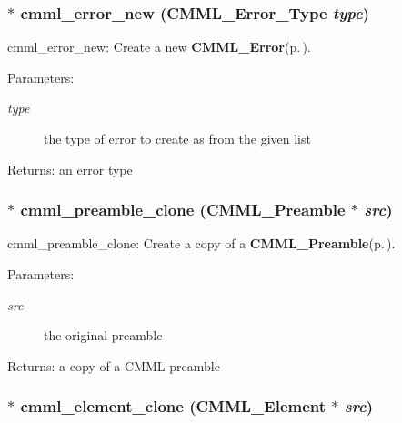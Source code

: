 \subsubsection{$\ast$ cmml\_\-error\_\-new ({\bf CMML\_\-Error\_\-Type} {\em type})}\label{cmml_8h_a61}


cmml\_\-error\_\-new: Create a new {\bf CMML\_\-Error}{\rm (p.\,\pageref{structCMML__Error})}.

\begin{Desc}
\item[Parameters:]
\begin{description}
\item[{\em type}]the type of error to create as from the given list\end{description}
\end{Desc}
\begin{Desc}
\item[Returns:]an error type \end{Desc}
\subsubsection{$\ast$ cmml\_\-preamble\_\-clone ({\bf CMML\_\-Preamble} $\ast$ {\em src})}\label{cmml_8h_a62}


cmml\_\-preamble\_\-clone: Create a copy of a {\bf CMML\_\-Preamble}{\rm (p.\,\pageref{structCMML__Preamble})}.

\begin{Desc}
\item[Parameters:]
\begin{description}
\item[{\em src}]the original preamble\end{description}
\end{Desc}
\begin{Desc}
\item[Returns:]a copy of a CMML preamble \end{Desc}
\subsubsection{$\ast$ cmml\_\-element\_\-clone ({\bf CMML\_\-Element} $\ast$ {\em src})}\label{cmml_8h_a63}


